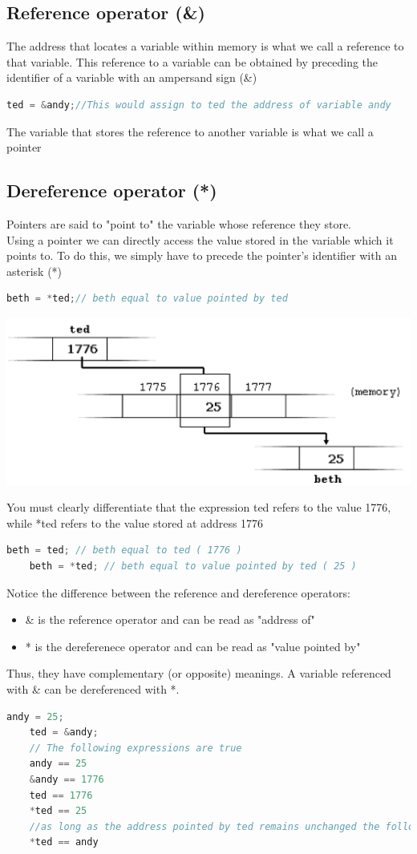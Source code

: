 \documentclass[12pt,oneside]{book}
\begin{document}
\subsection{Reference operator (\&)}
The address that locates a variable within memory is what we call a reference to that variable. This reference to a variable can be obtained by preceding the identifier of a variable with an ampersand sign (\&)
\begin{lstlisting}[language=C++]
    ted = &andy;//This would assign to ted the address of variable andy
\end{lstlisting}
The variable that stores the reference to another variable is what we call a pointer
\subsection{Dereference operator (*)}
Pointers are said to "point to" the variable whose reference they store.\\
Using a pointer we can directly access the value stored in the variable which it points to. To do this, we simply have to precede the pointer's identifier with an asterisk (*)
\begin{lstlisting}[language=C++]
    beth = *ted;// beth equal to value pointed by ted
\end{lstlisting}
\begin{center}
	\includegraphics[width=0.5\linewidth]{../pic/3316/31.png}
\end{center}
You must clearly differentiate that the expression ted refers to the value 1776, while *ted refers to the value stored at address 1776
	\begin{lstlisting}[language=C++]
    beth = ted; // beth equal to ted ( 1776 )
    beth = *ted; // beth equal to value pointed by ted ( 25 )
\end{lstlisting}
Notice the difference between the reference and dereference operators:
\begin{itemize}
	\item \& is the reference operator and can be read as "address of"
	\item * is the dereferenece operator and can be read as "value pointed by"
\end{itemize}
Thus, they have complementary (or opposite) meanings. A variable referenced with \& can be dereferenced with *.
	\begin{lstlisting}[language=C++]
    andy = 25; 
    ted = &andy;
    // The following expressions are true
    andy == 25 
    &andy == 1776
    ted == 1776 
    *ted == 25 
    //as long as the address pointed by ted remains unchanged the following expression will be true: 
    *ted == andy
\end{lstlisting}
\end{document}
